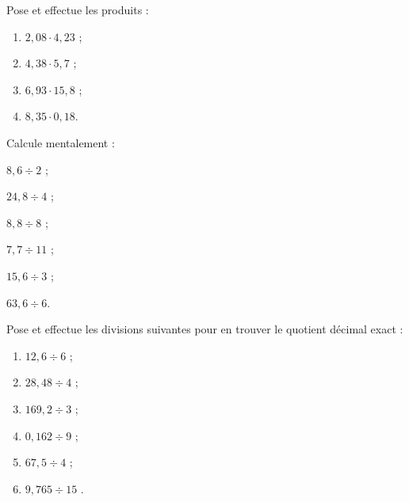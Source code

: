 \begin{exercice}
Pose et effectue les produits :
\begin{enumerate} 
 \item $2,08 \cdot 4,23$ \dotfill ; \hspace*{11em}
 
 \item $4,38 \cdot 5,7$ \dotfill ; \hspace*{11em}
 
 \item $6,93 \cdot 15,8$ \dotfill ; \hspace*{11em}
 
 \item $8,35 \cdot 0,18 $\dotfill. \hspace*{11em} 
 \end{enumerate}
\end{exercice}


\begin{exercice} 
Calcule mentalement :
\begin{colenumerate}{2}
 \item $ 8,6 \div 2$ ;
 \item $ 24,8 \div 4$ ;
 \item $ 8,8 \div 8$ ;
 \item $ 7,7 \div 11$ ;
 \item $ 15,6 \div 3$ ;
 \item $ 63,6 \div 6$.
 \end{colenumerate}
\end{exercice}


\begin{exercice} 
Pose et effectue les divisions suivantes pour en trouver le quotient décimal exact :
\begin{enumerate} 
 \item $ 12,6 \div 6$ \dotfill ; \hspace*{11em}
 
 \item $ 28,48 \div 4$ \dotfill ; \hspace*{11em}

 \item $ 169,2 \div 3$ \dotfill ; \hspace*{11em}

 \item $ 0,162 \div 9$ \dotfill ; \hspace*{11em}

 \item $ 67,5 \div 4$ \dotfill ; \hspace*{11em}

 \item $ 9,765 \div 15$ \dotfill. \hspace*{11em}
 \end{enumerate}
\end{exercice}


